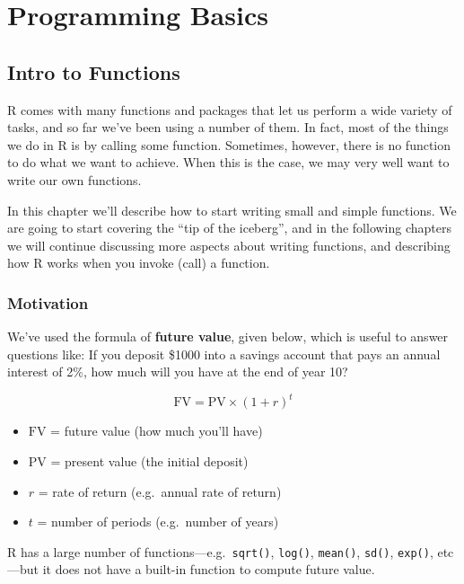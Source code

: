 \documentclass[
]{book}
\providecommand{\tightlist}{%
  \setlength{\itemsep}{0pt}\setlength{\parskip}{0pt}}
\begin{document}
\hypertarget{part-programming-basics}{%
\part{Programming Basics}\label{part-programming-basics}}

\hypertarget{functions1}{%
\chapter{Intro to Functions}\label{functions1}}

R comes with many functions and packages that let us perform a wide variety
of tasks, and so far we've been using a number of them. In fact, most of the
things we do in R is by calling some function. Sometimes, however, there is no
function to do what we want to achieve. When this is the case, we may very
well want to write our own functions.

In this chapter we'll describe how to start writing small and simple functions.
We are going to start covering the ``tip of the iceberg'', and in the following
chapters we will continue discussing more aspects about writing functions, and
describing how R works when you invoke (call) a function.

\hypertarget{motivation-1}{%
\section{Motivation}\label{motivation-1}}

We've used the formula of \textbf{future value}, given below, which is useful to
answer questions like: If you deposit \$1000 into a savings account that pays
an annual interest of 2\%, how much will you have at the end of year 10?

\[
\text{FV} = \text{PV} \times (1 + r)^t
\]

\begin{itemize}
\tightlist
\item
  \(\text{FV}\) = future value (how much you'll have)
\item
  \(\text{PV}\) = present value (the initial deposit)
\item
  \(r\) = rate of return (e.g.~annual rate of return)
\item
  \(t\) = number of periods (e.g.~number of years)
\end{itemize}

R has a large number of functions---e.g.~\texttt{sqrt()}, \texttt{log()}, \texttt{mean()},
\texttt{sd()}, \texttt{exp()}, etc---but it does not have a built-in function to compute
future value.
\end{document}
